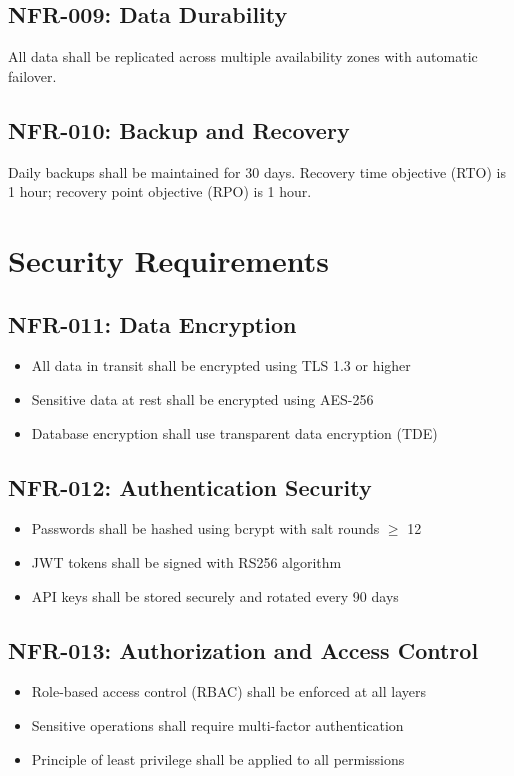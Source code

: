 \documentclass{report}
\begin{document}
\subsection{NFR-009: Data Durability}
All data shall be replicated across multiple availability zones with automatic failover.

\subsection{NFR-010: Backup and Recovery}
Daily backups shall be maintained for 30 days. Recovery time objective (RTO) is 1 hour; recovery point objective (RPO) is 1 hour.

\section{Security Requirements}

\subsection{NFR-011: Data Encryption}
\begin{itemize}
    \item All data in transit shall be encrypted using TLS 1.3 or higher
    \item Sensitive data at rest shall be encrypted using AES-256
    \item Database encryption shall use transparent data encryption (TDE)
\end{itemize}

\subsection{NFR-012: Authentication Security}
\begin{itemize}
    \item Passwords shall be hashed using bcrypt with salt rounds $\geq$ 12
    \item JWT tokens shall be signed with RS256 algorithm
    \item API keys shall be stored securely and rotated every 90 days
\end{itemize}

\subsection{NFR-013: Authorization and Access Control}
\begin{itemize}
    \item Role-based access control (RBAC) shall be enforced at all layers
    \item Sensitive operations shall require multi-factor authentication
    \item Principle of least privilege shall be applied to all permissions
\end{itemize}
\end{document}
